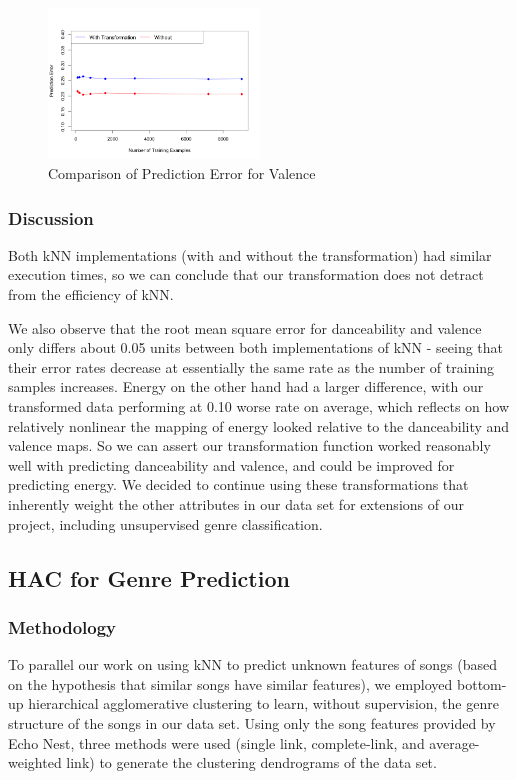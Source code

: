 \documentclass{article}
\begin{document}
\begin{figure}[H]
\includegraphics[width=0.5\textwidth]{../images/valence_error.png}
\caption{Comparison of Prediction Error for Valence}
\label{valence_error}
\end{figure}

\subsubsection{Discussion}
Both kNN implementations (with and without the transformation) had similar
execution times, so we can conclude that our transformation does not detract
from the efficiency of kNN.

We also observe that the root mean square error for danceability and valence
only differs about 0.05 units between both implementations of kNN - seeing that
their error rates decrease at essentially the same rate as the number of
training samples increases. Energy on the other hand had a larger difference,
with our transformed data performing at 0.10 worse rate on average, which
reflects on how relatively nonlinear the mapping of energy looked relative to
the danceability and valence maps. So we can assert our transformation function
worked reasonably well with predicting danceability and valence, and could be
improved for predicting energy. We decided to continue using these
transformations that inherently weight the other attributes in our data set for
extensions of our project, including unsupervised genre classification.

\subsection{HAC for Genre Prediction}
\subsubsection{Methodology}
To parallel our work on using kNN to predict unknown features of songs (based on
the hypothesis that similar songs have similar features), we  employed bottom-up
hierarchical agglomerative clustering to learn, without supervision, the genre
structure of the songs in our data set. Using only  the song features provided
by Echo Nest, three methods were used (single link, complete-link, and
average-weighted link) to generate the clustering dendrograms of the data set.
\end{document}
